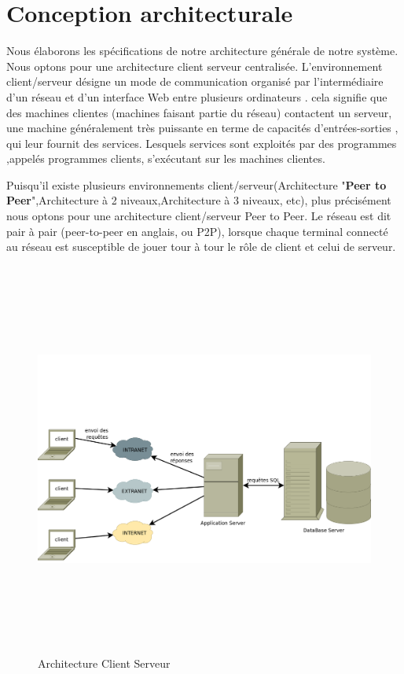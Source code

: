	\section{Conception architecturale}
		Nous élaborons les spécifications de notre architecture générale de notre système. Nous optons pour une architecture client serveur centralisée. L'environnement client/serveur désigne un mode de communication organisé par l'intermédiaire d'un réseau et d'un interface Web entre plusieurs ordinateurs . \og cela signifie que des machines clientes (machines faisant partie du réseau) contactent un serveur, une machine généralement très puissante en terme de capacités d'entrées-sorties , qui leur fournit des services. Lesquels services sont exploités par des programmes ,appelés programmes clients, s'exécutant sur les machines clientes. \fg
		
		Puisqu'il existe plusieurs environnements client/serveur(Architecture "\textbf{Peer to Peer}",Architecture à 2 niveaux,Architecture à 3 niveaux, etc), plus précisément nous optons pour une architecture client/serveur Peer to Peer. Le réseau est dit pair à pair (peer-to-peer en anglais, ou P2P), lorsque chaque terminal connecté au réseau est susceptible de jouer tour à tour le rôle de client et celui de serveur.
		
			\begin{figure}[H]
					\centering		
					\includegraphics[width=18cm, height=13cm]{../imgs/clientserveur.png} 				
					\caption{Architecture Client Serveur }
					\label{archiclientserver}
			\end{figure}
		
